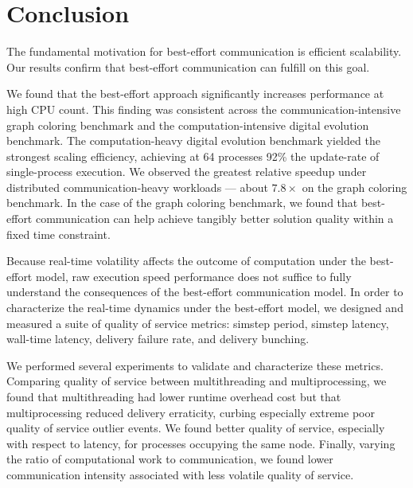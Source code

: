 \section{Conclusion}

The fundamental motivation for best-effort communication is efficient scalability.
Our results confirm that best-effort communication can fulfill on this goal.

We found that the best-effort approach significantly increases performance at high CPU count.
This finding was consistent across the communication-intensive graph coloring benchmark and the computation-intensive digital evolution benchmark.
The computation-heavy digital evolution benchmark yielded the strongest scaling efficiency, achieving at 64 processes 92\% the update-rate of single-process execution.
We observed the greatest relative speedup under distributed communication-heavy workloads --- about $7.8\times$ on the graph coloring benchmark.
In the case of the graph coloring benchmark, we found that best-effort communication can help achieve tangibly better solution quality within a fixed time constraint.

Because real-time volatility affects the outcome of computation under the best-effort model, raw execution speed performance does not suffice to fully understand the consequences of the best-effort communication model.
In order to characterize the real-time dynamics under the best-effort model, we designed and measured a suite of quality of service metrics: simstep period, simstep latency, wall-time latency, delivery failure rate, and delivery bunching.

We performed several experiments to validate and characterize these metrics.
Comparing quality of service between multithreading and multiprocessing, we found that multithreading had lower runtime overhead cost but that multiprocessing reduced delivery erraticity, curbing especially extreme poor quality of service outlier events.
We found better quality of service, especially with respect to latency, for processes occupying the same node.
Finally, varying the ratio of computational work to communication, we found lower communication intensity associated with less volatile quality of service.


